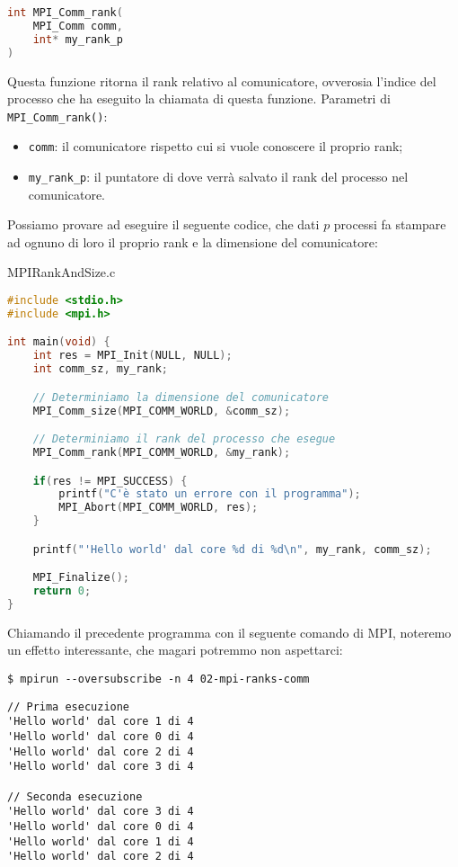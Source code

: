 \begin{codedefine}
    \begin{lstlisting}[language = C, numbers = none]
int MPI_Comm_rank(
    MPI_Comm comm,
    int* my_rank_p
)\end{lstlisting}
    \manlower
    Questa funzione ritorna il rank relativo al comunicatore, ovverosia l'indice del processo che ha eseguito la chiamata di questa funzione.
    \nl
    Parametri di \verb|MPI_Comm_rank()|:
    \begin{itemize}
        \item \verb|comm|: il comunicatore rispetto cui si vuole conoscere il proprio rank;
        \item \verb|my_rank_p|: il puntatore di dove verrà salvato il rank del processo nel comunicatore.
    \end{itemize}
\end{codedefine}

Possiamo provare ad eseguire il seguente codice, che dati $p$ processi fa stampare ad ognuno di loro il proprio rank e la dimensione del comunicatore:

\begin{codeblock}{MPIRankAndSize.c}
    \begin{lstlisting}[language = C]
#include <stdio.h>
#include <mpi.h>

int main(void) {
    int res = MPI_Init(NULL, NULL);
    int comm_sz, my_rank;

    // Determiniamo la dimensione del comunicatore
    MPI_Comm_size(MPI_COMM_WORLD, &comm_sz);

    // Determiniamo il rank del processo che esegue
    MPI_Comm_rank(MPI_COMM_WORLD, &my_rank);

    if(res != MPI_SUCCESS) {
        printf("C'è stato un errore con il programma");
        MPI_Abort(MPI_COMM_WORLD, res);
    }

    printf("'Hello world' dal core %d di %d\n", my_rank, comm_sz);

    MPI_Finalize();
    return 0;
}
    \end{lstlisting}
\end{codeblock}

Chiamando il precedente programma con il seguente comando di MPI, noteremo un effetto interessante, che magari potremmo non aspettarci:

\begin{terminal}
    \begin{lstlisting}[style = notexterm]
 $ mpirun --oversubscribe -n 4 02-mpi-ranks-comm
    \end{lstlisting}
    \begin{tcolorbox}
        \begin{lstlisting}[basewidth=0.44em, numbers=none]
// Prima esecuzione
'Hello world' dal core 1 di 4
'Hello world' dal core 0 di 4
'Hello world' dal core 2 di 4
'Hello world' dal core 3 di 4

// Seconda esecuzione
'Hello world' dal core 3 di 4
'Hello world' dal core 0 di 4
'Hello world' dal core 1 di 4
'Hello world' dal core 2 di 4\end{lstlisting}
    \end{tcolorbox}
\end{terminal}

